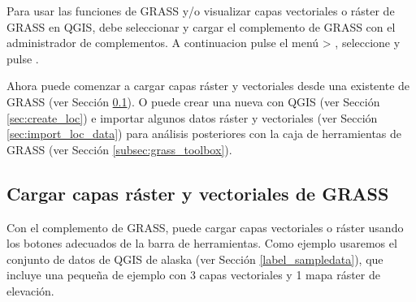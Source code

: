 Para usar las funciones de GRASS y/o visualizar capas vectoriales o ráster de GRASS en QGIS, debe seleccionar y cargar 
el complemento de GRASS con el administrador de complementos. 
A continuacion pulse el menú 
 > , 
seleccione  y pulse . 

Ahora puede comenzar a cargar capas ráster y vectoriales desde una  
 existente de 
GRASS (ver Sección \ref{sec:load_grassdata}). O puede crear una  nueva con QGIS (ver Sección \ref{sec:create_loc}) 
e importar algunos datos ráster y vectoriales (ver Sección \ref{sec:import_loc_data}) 
para análisis posteriores con la
caja de herramientas de GRASS (ver Sección \ref{subsec:grass_toolbox}).

\subsection{Cargar capas ráster y vectoriales de GRASS}\label{sec:load_grassdata}

Con el complemento de GRASS, puede cargar capas vectoriales o ráster usando los botones adecuados de la barra de herramientas. 
Como ejemplo usaremos el conjunto de datos de QGIS de alaska
(ver Sección \ref{label_sampledata}), que incluye una pequeña  de ejemplo con 3 capas vectoriales y 1 mapa ráster de elevación.

